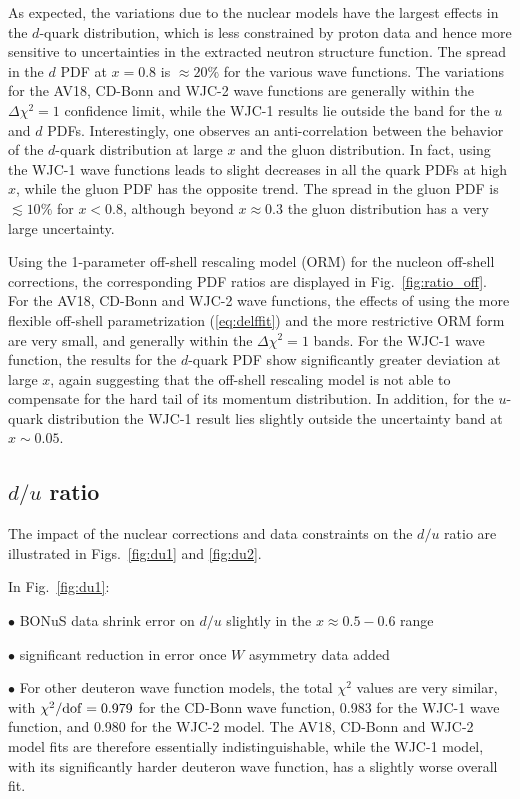 \documentclass[aps,prd,amsmath,preprint]{revtex4}
\begin{document}
As expected, the variations due to the nuclear models have the
largest effects in the $d$-quark distribution, which is less
constrained by proton data and hence more sensitive to uncertainties
in the extracted neutron structure function.
The spread in the $d$ PDF at $x=0.8$ is $\approx 20\%$ for the
various wave functions.
The variations for the AV18, CD-Bonn and WJC-2 wave functions are
generally within the $\Delta\chi^2=1$ confidence limit, while the
WJC-1 results lie outside the band for the $u$ and $d$ PDFs.
Interestingly, one observes an anti-correlation between the
behavior of the $d$-quark distribution at large $x$ and the
gluon distribution.  In fact, using the WJC-1 wave functions
leads to slight decreases in all the quark PDFs at high $x$,
while the gluon PDF has the opposite trend.
The spread in the gluon PDF is $\lesssim 10\%$ for $x<0.8$,
although beyond $x \approx 0.3$ the gluon distribution has
a very large uncertainty.


Using the 1-parameter off-shell rescaling model (ORM) for the
nucleon off-shell corrections, the corresponding PDF ratios
are displayed in Fig.~\ref{fig:ratio_off}.
For the AV18, CD-Bonn and WJC-2 wave functions, the effects of
using the more flexible off-shell parametrization (\ref{eq:delffit})
and the more restrictive ORM form are very small, and generally
within the $\Delta\chi^2=1$ bands.
For the WJC-1 wave function, the results for the $d$-quark PDF
show significantly greater deviation at large $x$, again
suggesting that the off-shell rescaling model is not able to
compensate for the hard tail of its momentum distribution.
In addition, for the $u$-quark distribution the WJC-1 result
lies slightly outside the uncertainty band at $x \sim 0.05$.


\subsection{$d/u$ ratio}
\label{ssec:du}

The impact of the nuclear corrections and data constraints on
the $d/u$ ratio are illustrated in Figs.~\ref{fig:du1} and
\ref{fig:du2}.


In Fig.~\ref{fig:du1}:

$\bullet$
BONuS data shrink error on $d/u$ slightly in the
$x \approx 0.5-0.6$ range


$\bullet$
significant reduction in error once $W$ asymmetry data added


$\bullet$
For other deuteron wave function models, the total $\chi^2$ values
are very similar, with
$\chi^2/{\rm dof} = 0.979$ for the CD-Bonn wave function,
0.983 for the WJC-1 wave function, and
0.980 for the WJC-2 model.
The AV18, CD-Bonn and WJC-2 model fits are therefore essentially
indistinguishable, while the WJC-1 model, with its significantly
harder deuteron wave function, has a slightly worse overall fit.
\end{document}
